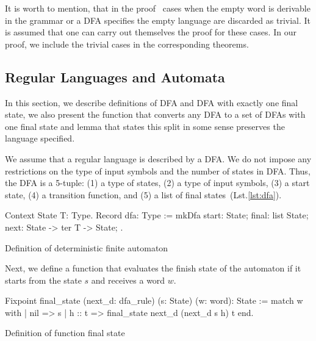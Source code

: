 It is worth to mention, that in the proof~\cite{beigelproof} cases when the empty word is derivable in the grammar or a DFA specifies the empty language are discarded as trivial.
It is assumed that one can carry out themselves the proof for these cases.
In our proof, we include the trivial cases in the corresponding theorems.

\subsection{Regular Languages and Automata}

In this section, we describe definitions of DFA and DFA with exactly one final state, we also present the function that converts any DFA to a set of DFAs with one final state and lemma that states this split in some sense preserves the language specified.

We assume that a regular language is described by a DFA. We do not impose any restrictions on the type of input symbols and the number of states in DFA. Thus, the DFA is a 5-tuple: (1) a type of states, (2) a type of input symbols, (3) a start state, (4) a transition function, and (5) a list of final states~(Lst.\ref{lst:dfa}).

\begin{listing}[h]
    \begin{pyglist}[language=coq, numbers=none, numbersep=5pt]
  Context {State T: Type}.
  Record dfa: Type :=
    mkDfa {
      start: State;
      final: list State;
      next: State -> ter T -> State;
    }.
    \end{pyglist}
    \caption{Definition of deterministic finite automaton}
    \label{lst:dfa}
\end{listing}

Next, we define a function that evaluates the finish state of the automaton if it starts from the state $s$ and receives a word $w$. 

\begin{listing}[h]
    \begin{pyglist}[language=coq, numbers=none, numbersep=5pt]
  Fixpoint final_state 
             (next_d: dfa_rule) 
             (s: State) 
             (w: word): State :=
    match w with
    | nil => s 
    | h :: t => final_state next_d 
                            (next_d s h)
                            t 
    end.
    \end{pyglist}
    \caption{Definition of function final state}
    \label{lst:verbments1}
\end{listing}

